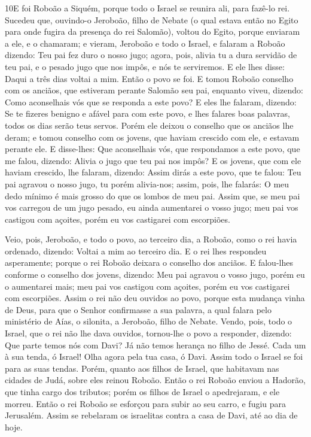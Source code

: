 \lettrine{10} E foi Roboão a Siquém, porque todo o Israel se
reunira ali, para fazê-lo rei. Sucedeu que, ouvindo-o Jeroboão,
filho de Nebate (o qual estava então no Egito para onde fugira da
presença do rei Salomão), voltou do Egito, porque enviaram a
ele, e o chamaram; e vieram, Jeroboão e todo o Israel, e falaram a
Roboão dizendo: Teu pai fez duro o nosso jugo; agora, pois,
alivia tu a dura servidão de teu pai, e o pesado jugo que nos impôs,
e nós te serviremos. E ele lhes disse: Daqui a três dias voltai
a mim. Então o povo se foi. E tomou Roboão conselho com os
anciãos, que estiveram perante Salomão seu pai, enquanto viveu,
dizendo: Como aconselhais vós que se responda a este povo? E
eles lhe falaram, dizendo: Se te fizeres benigno e afável para com
este povo, e lhes falares boas palavras, todos os dias serão teus
servos. Porém ele deixou o conselho que os anciãos lhe deram; e
tomou conselho com os jovens, que haviam crescido com ele, e estavam
perante ele. E disse-lhes: Que aconselhais vós, que respondamos
a este povo, que me falou, dizendo: Alivia o jugo que teu pai nos
impôs? E os jovens, que com ele haviam crescido, lhe falaram,
dizendo: Assim dirás a este povo, que te falou: Teu pai agravou o
nosso jugo, tu porém alivia-nos; assim, pois, lhe falarás: O meu
dedo mínimo é mais grosso do que os lombos de meu pai. Assim
que, se meu pai vos carregou de um jugo pesado, eu ainda aumentarei
o vosso jugo; meu pai vos castigou com açoites, porém eu vos
castigarei com escorpiões.

Veio, pois, Jeroboão, e todo o povo, ao terceiro dia, a Roboão,
como o rei havia ordenado, dizendo: Voltai a mim ao terceiro dia.
E o rei lhes respondeu asperamente; porque o rei Roboão
deixara o conselho dos anciãos. E falou-lhes conforme o
conselho dos jovens, dizendo: Meu pai agravou o vosso jugo, porém eu
o aumentarei mais; meu pai vos castigou com açoites, porém eu vos
castigarei com escorpiões. Assim o rei não deu ouvidos ao
povo, porque esta mudança vinha de Deus, para que o Senhor
confirmasse a sua palavra, a qual falara pelo ministério de Aías, o
silonita, a Jeroboão, filho de Nebate. Vendo, pois, todo o
Israel, que o rei não lhe dava ouvidos, tornou-lhe o povo a
responder, dizendo: Que parte temos nós com Davi? Já não temos
herança no filho de Jessé. Cada um à sua tenda, ó Israel! Olha agora
pela tua casa, ó Davi. Assim todo o Israel se foi para as suas
tendas. Porém, quanto aos filhos de Israel, que habitavam nas
cidades de Judá, sobre eles reinou Roboão. Então o rei Roboão
enviou a Hadorão, que tinha cargo dos tributos; porém os filhos de
Israel o apedrejaram, e ele morreu. Então o rei Roboão se esforçou
para subir ao seu carro, e fugiu para Jerusalém. Assim se
rebelaram os israelitas contra a casa de Davi, até ao dia de hoje.

